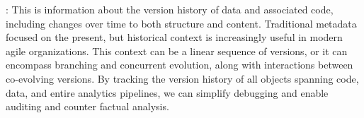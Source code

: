 \documentclass{sig-alternate}
\begin{document}
:
This is information about the version history of data and associated code, including changes over time to both structure and content. 
Traditional metadata focused on the present, but historical context is increasingly useful in modern agile organizations.
This context can be a linear sequence of versions, or it can encompass branching and concurrent evolution, along with interactions 
between co-evolving versions.
By tracking the version history of all objects spanning code, data, and entire analytics pipelines, we can simplify debugging and enable auditing and counter factual analysis.



\end{document}
